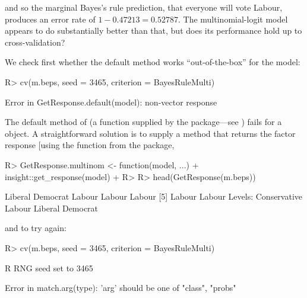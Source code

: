 \documentclass[
]{jss}
\begin{document}
and so the marginal Bayes's rule prediction, that everyone will vote
Labour, produces an error rate of \(1 - 0.47213 = 0.52787\). The
multinomial-logit model appears to do substantially better than that,
but does its performance hold up to cross-validation?

We check first whether the default  method works
``out-of-the-box'' for the  model:

\begin{CodeChunk}
\begin{CodeInput}
R> cv(m.beps, seed = 3465, criterion = BayesRuleMulti)
\end{CodeInput}
\begin{CodeOutput}
Error in GetResponse.default(model): non-vector response
\end{CodeOutput}
\end{CodeChunk}

The default method of  (a function supplied by the
 package---see ) fails for a
 object. A straightforward solution is to supply a
 method that returns the factor response
{[}using the  function from the 
package,

\begin{CodeChunk}
\begin{CodeInput}
R> GetResponse.multinom <- function(model, ...) {
+   insight::get_response(model)
+ }
R>
R> head(GetResponse(m.beps))
\end{CodeInput}
\begin{CodeOutput}
[1] Liberal Democrat Labour           Labour           Labour
[5] Labour           Labour
Levels: Conservative Labour Liberal Democrat
\end{CodeOutput}
\end{CodeChunk}

and to try again:

\begin{CodeChunk}
\begin{CodeInput}
R> cv(m.beps, seed = 3465, criterion = BayesRuleMulti)
\end{CodeInput}
\begin{CodeOutput}
R RNG seed set to 3465
\end{CodeOutput}
\begin{CodeOutput}
Error in match.arg(type): 'arg' should be one of "class", "probs"
\end{CodeOutput}
\end{CodeChunk}
\end{document}
